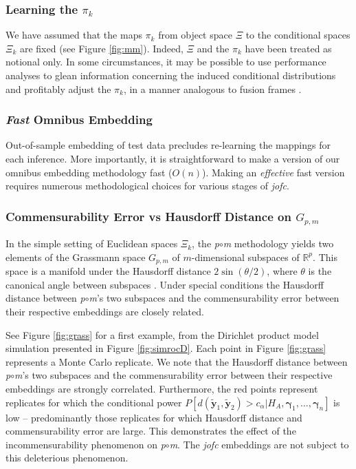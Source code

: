 \documentclass[12pt,xcolor]{article}
\newcommand{\1}{\ensuremath{\mbox{{\bf 1}}}}
\newcommand{\Real}{\mathbb{R}}
\begin{document}
\subsubsection*{Learning the $\pi_k$}

We have assumed that the maps $\pi_k$ from object space $\Xi$
to the conditional spaces $\Xi_k$ are fixed (see Figure \ref{fig:mm}).
Indeed, $\Xi$ and the $\pi_k$ have been treated as notional only.
In some circumstances, it may be possible to use performance analyses
to glean information concerning the induced conditional distributions
and profitably adjust the $\pi_k$, in a manner analogous to fusion frames \cite{FF}.

\subsubsection*{{\em Fast} Omnibus Embedding}

Out-of-sample embedding of test data precludes re-learning the mappings for each inference.
More importantly,
it is straightforward to make a version of our omnibus embedding methodology fast ($O(n)$).
Making an {\em effective} fast version requires numerous methodological choices
for various stages of {\em jofc}.

\subsubsection*{Commensurability Error vs Hausdorff Distance on $G_{p,m}$}\label{section:Gr}


In the simple setting of Euclidean spaces $\Xi_k$,
the {\it p}$\circ${\it m} methodology yields two elements of the Grassmann space $G_{p,m}$ of $m$-dimensional subspaces of $\Real^{p}$.
This space is a manifold under the Hausdorff distance
$2\sin(\theta/2)$, where $\theta$ is the canonical angle between subspaces \cite{1103435}.
Under special conditions the Hausdorff distance between {\it p}$\circ${\it m}'s two subspaces and
the commensurability error between their respective embeddings are closely related.

See Figure \ref{fig:grass} for a first example, from the Dirichlet product model simulation presented in
Figure \ref{fig:simrocD}. Each point in Figure \ref{fig:grass} represents a Monte Carlo replicate.
We note that the Hausdorff distance between {\it p}$\circ${\it m}'s two subspaces and
the commensurability error between their respective embeddings are strongly correlated.
Furthermore, the red points represent replicates for which the conditional power
$P[d(\widetilde{\bm{y}}_1,\widetilde{\bm{y}}_2)>c_{\alpha} | H_A,\bm{\gamma}_1,\ldots,\bm{\gamma}_n]$ is low --
predominantly those replicates for which Hausdorff distance and commensurability error are large.
This demonstrates the effect of the incommensurability phenomenon on {\it p}$\circ${\it m}.
The {\em jofc} embeddings are not subject to this deleterious phenomenon.
\end{document}
